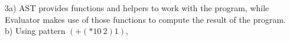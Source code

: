 \documentclass[12pt]{article}
\begin{document}
\noindent 3a) AST provides functions and helpers to work with the program, while Evaluator makes use of those functions to compute the result of the program. \\

\noindent b) Using pattern $(+ (* 10\ 2) 1)$, 

\end{document}

